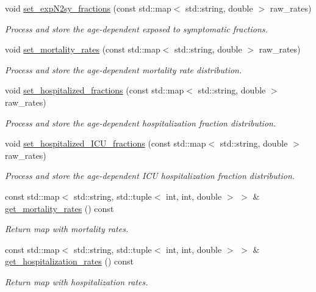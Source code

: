 \begin{DoxyCompactItemize}
void \hyperlink{classInfection_a34eefa18fbef918bca0077814ae76077}{set\+\_\+exp\+N2sy\+\_\+fractions} (const std\+::map$<$ std\+::string, double $>$ raw\+\_\+rates)
\begin{DoxyCompactList}\small\item\em Process and store the age-\/dependent exposed to symptomatic fractions. \end{DoxyCompactList}\item 
void \hyperlink{classInfection_a9fa94be47902e58b63d64fbae66bca91}{set\+\_\+mortality\+\_\+rates} (const std\+::map$<$ std\+::string, double $>$ raw\+\_\+rates)
\begin{DoxyCompactList}\small\item\em Process and store the age-\/dependent mortality rate distribution. \end{DoxyCompactList}\item 
void \hyperlink{classInfection_ae5a3f5e20e0f22d3dede73c9c0325dbc}{set\+\_\+hospitalized\+\_\+fractions} (const std\+::map$<$ std\+::string, double $>$ raw\+\_\+rates)
\begin{DoxyCompactList}\small\item\em Process and store the age-\/dependent hospitalization fraction distribution. \end{DoxyCompactList}\item 
void \hyperlink{classInfection_a2f502305ea9c698d01e7d572fd304a88}{set\+\_\+hospitalized\+\_\+\+I\+C\+U\+\_\+fractions} (const std\+::map$<$ std\+::string, double $>$ raw\+\_\+rates)
\begin{DoxyCompactList}\small\item\em Process and store the age-\/dependent I\+CU hospitalization fraction distribution. \end{DoxyCompactList}\item 
const std\+::map$<$ std\+::string, std\+::tuple$<$ int, int, double $>$ $>$ \& \hyperlink{classInfection_a8244b3faf60b743632dddd50f866dae9}{get\+\_\+mortality\+\_\+rates} () const
\begin{DoxyCompactList}\small\item\em Return map with mortality rates. \end{DoxyCompactList}\item 
const std\+::map$<$ std\+::string, std\+::tuple$<$ int, int, double $>$ $>$ \& \hyperlink{classInfection_aa6c5bd4852e85ab81319df5dd85526bf}{get\+\_\+hospitalization\+\_\+rates} () const
\begin{DoxyCompactList}\small\item\em Return map with hospitalization rates. \end{DoxyCompactList}\item 

\end{DoxyCompactItemize}
